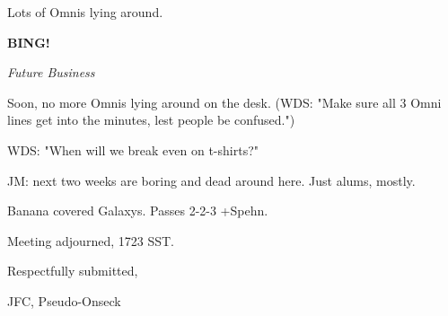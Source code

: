 \documentclass[12pt]{article}
\newcommand{\bing}{{\bf BING!} }
\newcommand{\goto}[1]{\bing \vskip 12pt \centerline{{\em{#1}}}}
\begin{document}
Lots of Omnis lying around.

\goto{Future Business}

Soon, no more Omnis lying around on the desk. (WDS: "Make sure all 3 Omni lines get into the minutes, lest people be confused.")

WDS: "When will we break even on t-shirts?"

JM: next two weeks are boring and dead around here. Just alums, mostly.

Banana covered Galaxys. Passes 2-2-3 +Spehn.

\vspace{12pt}

\noindent
Meeting adjourned, 1723 SST.

\vspace{18pt}

\centerline{Respectfully submitted,}
\centerline{JFC, Pseudo-Onseck}
\end{document}
